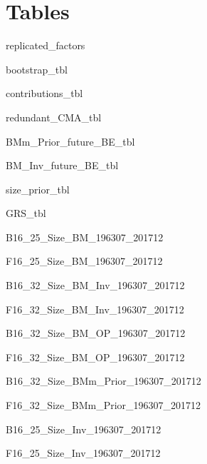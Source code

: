 
\section{Tables} \label{sec:tables}

{replicated_factors}

\begin{landscape}
{bootstrap_tbl}
\end{landscape}

{contributions_tbl}

{redundant_CMA_tbl}

{BMm_Prior_future_BE_tbl}

{BM_Inv_future_BE_tbl}

{size_prior_tbl}

{GRS_tbl}

{B16_25_Size_BM_196307_201712}

{F16_25_Size_BM_196307_201712}

\begin{landscape}
{B16_32_Size_BM_Inv_196307_201712}
\end{landscape}

\begin{landscape}
{F16_32_Size_BM_Inv_196307_201712}
\end{landscape}

\begin{landscape}
{B16_32_Size_BM_OP_196307_201712}
\end{landscape}

\begin{landscape}
{F16_32_Size_BM_OP_196307_201712}
\end{landscape}

\begin{landscape}
{B16_32_Size_BMm_Prior_196307_201712}
\end{landscape}

\begin{landscape}
{F16_32_Size_BMm_Prior_196307_201712}
\end{landscape}

{B16_25_Size_Inv_196307_201712}

{F16_25_Size_Inv_196307_201712}

